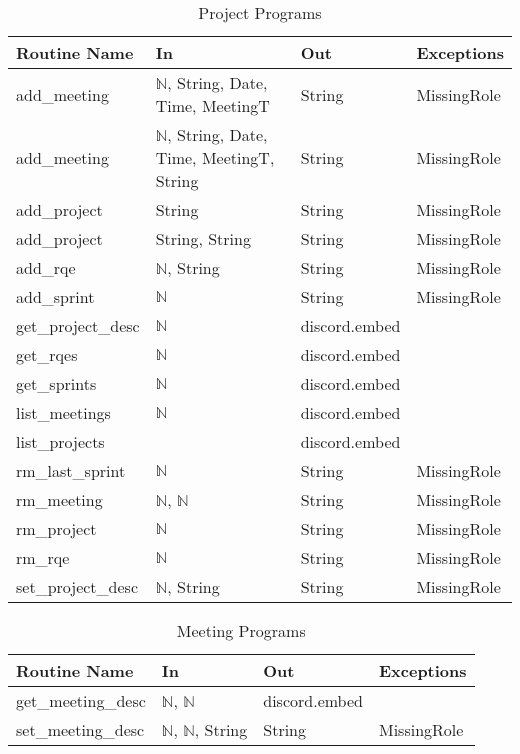 \documentclass[12pt, titlepage]{article}
\begin{document}
\begin{table}[!htb]
    \centering
    \begin{tabular}{|p{3.5cm}|p{4cm}|p{3cm}|p{3cm}|}
        \hline
        \textbf{Routine Name} & \textbf{In} & \textbf{Out} & \textbf{Exceptions} \\
        \hline
        add\_meeting & $\mathbb{N}$, String, Date, Time, MeetingT & String & MissingRole\\
        \hline
        add\_meeting & $\mathbb{N}$, String, Date, Time, MeetingT, String & String & MissingRole\\
        \hline
        add\_project & String & String & MissingRole \\
        \hline
        add\_project & String, String & String & MissingRole \\
        \hline
        add\_rqe & $\mathbb{N}$, String & String & MissingRole \\
        \hline
        add\_sprint & $\mathbb{N}$ & String & MissingRole \\
        \hline
        get\_project\_desc & $\mathbb{N}$ & discord.embed & \\
        \hline
        get\_rqes & $\mathbb{N}$ & discord.embed & \\
        \hline
        get\_sprints & $\mathbb{N}$ & discord.embed & \\
        \hline
        list\_meetings & $\mathbb{N}$ & discord.embed & \\
        \hline
        list\_projects & & discord.embed & \\
        \hline
        rm\_last\_sprint & $\mathbb{N}$ & String & MissingRole \\
        \hline
        rm\_meeting & $\mathbb{N}$, $\mathbb{N}$ & String & MissingRole \\
        \hline
        rm\_project & $\mathbb{N}$ & String & MissingRole \\
        \hline
        rm\_rqe & $\mathbb{N}$ & String & MissingRole \\
        \hline
        set\_project\_desc & $\mathbb{N}$, String & String & MissingRole \\
        \hline
    \end{tabular}
    \caption{Project Programs}
    \label{tab:project}
\end{table}

\begin{table}[!htb]
    \centering
    \begin{tabular}{|p{3cm}|p{3cm}|p{3cm}|p{4.5cm}|}
        \hline
        \textbf{Routine Name} & \textbf{In} & \textbf{Out} & \textbf{Exceptions} \\
        \hline
        get\_meeting\_desc & $\mathbb{N}$, $\mathbb{N}$ & discord.embed & \\
        \hline
        set\_meeting\_desc & $\mathbb{N}$, $\mathbb{N}$, String & String & MissingRole \\
        \hline
    \end{tabular}
    \caption{Meeting Programs}
    \label{tab:meetings}
\end{table}
\end{document}

